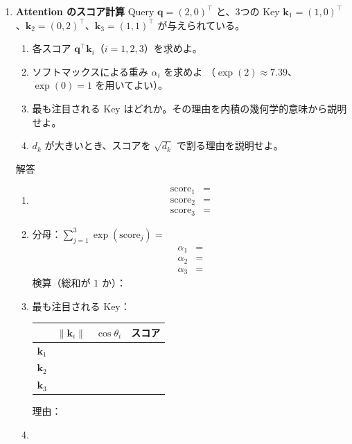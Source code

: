 \documentclass[a4paper,dvipdfmx]{jsarticle}
\newcommand{\学籍番号}{0000000}
\newcommand{\氏名}{氏名を書く}
\newcommand{\提出日}{2026年10月8日}
\newenvironment{answer}{\begin{itembox}[l]{解答}}{\end{itembox}}
\begin{document}
\begin{enumerate}
  \item \textbf{Attention のスコア計算}\quad
    Query $\bm{q} = (2, 0)^\top$ と、3つの Key
    $\bm{k}_1 = (1, 0)^\top$、$\bm{k}_2 = (0, 2)^\top$、$\bm{k}_3 = (1, 1)^\top$ が与えられている。
    \begin{enumerate}
      \item 各スコア $\bm{q}^\top \bm{k}_i$（$i = 1, 2, 3$）を求めよ。
      \item ソフトマックスによる重み $\alpha_i$ を求めよ
        （$\exp(2) \approx 7.39$、$\exp(0) = 1$ を用いてよい）。
      \item 最も注目される Key はどれか。その理由を内積の幾何学的意味から説明せよ。
      \item $d_k$ が大きいとき、スコアを $\sqrt{d_k}$ で割る理由を説明せよ。
    \end{enumerate}
    \begin{answer}
      \begin{enumerate}
        \item
          \begin{align*}
            \mathrm{score}_1 &= \\
            \mathrm{score}_2 &= \\
            \mathrm{score}_3 &=
          \end{align*}
        \item 分母：$\sum_{j=1}^{3} \exp(\mathrm{score}_j) = \phantom{XXXXXXXX}$
          \begin{align*}
            \alpha_1 &= \\
            \alpha_2 &= \\
            \alpha_3 &=
          \end{align*}
          検算（総和が $1$ か）：
        \item 最も注目される Key：
          \begin{center}
            \begin{tabular}{c|c|c|c}
              \hline
              & $\|\bm{k}_i\|$ & $\cos\theta_i$ & スコア \\
              \hline\hline
              $\bm{k}_1$ & & & \\
              $\bm{k}_2$ & & & \\
              $\bm{k}_3$ & & & \\
              \hline
            \end{tabular}
          \end{center}
          理由：
        \item
      \end{enumerate}
    \end{answer}
\end{enumerate}
\end{document}
